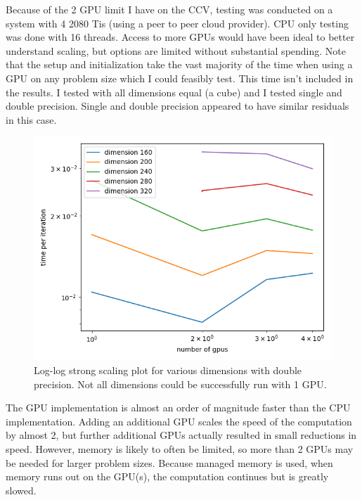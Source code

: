 \documentclass{article}
\begin{document}
Because of the 2 GPU limit I have on the CCV, testing was conducted on a system
with 4 2080 Tis (using a peer to peer cloud provider). CPU only testing was
done with 16 threads. Access to more GPUs would have been ideal to better understand
scaling, but options are limited without substantial spending.  Note that the
setup and initialization take the vast majority of the time when using a GPU on
any problem size which I could feasibly test. This time isn't included in the
results. I tested with all dimensions equal (a cube) and I tested single and
double precision.  Single and double precision appeared to have similar
residuals in this case. \\

\begin{figure}[H] 
  \centering
  \includegraphics[width=0.8\linewidth]{../strong_scaling.png}
  \caption{Log-log strong scaling plot for various dimensions with double 
    precision.  Not all dimensions could be successfully run with 1 GPU.}
\end{figure}


The GPU implementation is almost an order of magnitude faster than the CPU
implementation. Adding an additional GPU scales the speed of the computation by
almost 2, but further additional GPUs actually resulted in small reductions in
speed. However, memory is likely to often be limited, so more than 2 GPUs may
be needed for larger problem sizes. Because managed memory is used, when memory
runs out on the GPU(s), the computation continues but is greatly slowed. \\
\end{document}

